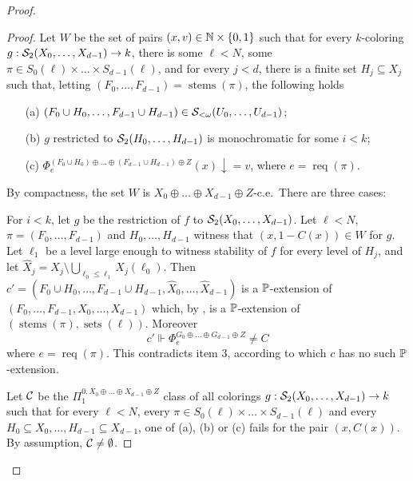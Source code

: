 \begin{proof}
\begin{proof}
Let $W$ be the set of pairs $(x, v) \in \mathbb{N} \times \{0,1\}$ such that for every $k$-coloring $g: \mathcal{S}_{2}({X_0, \dots, X_{d-1}}) \to k$, there is some $\ell < N$, some $\pi \in S_0(\ell) \times \dots \times S_{d-1}(\ell)$, and for every $j < d$, there is a finite set $H_j \subseteq X_j$ such that, letting $(F_0, \dots, F_{d-1}) = \operatorname{stems}(\pi)$, the following holds
\begin{itemize}
	\item[(a)] $(F_0 \cup H_0, \dots, F_{d-1} \cup H_{d-1}) \in \mathcal{S}_{<\omega}({U_0, \dots, U_{d-1}})$;
	\item[(b)] $g$ restricted to $\mathcal{S}_{2}({H_0, \dots, H_{d-1}})$ is monochromatic for some $i < k$;
	\item[(c)] $\Phi_e^{(F_0 \cup H_0) \oplus \dots \oplus (F_{d-1} \cup H_{d-1}) \oplus Z}(x)\downarrow = v$, where $e = \operatorname{req}(\pi)$.
\end{itemize}
By compactness, the set $W$ is $X_0 \oplus \dots \oplus X_{d-1} \oplus Z$-c.e.\ There are three cases:

 For $i < k$, let $g$ be the restriction of $f$ to $\mathcal{S}_{2}({X_0, \dots, X_{d-1}})$. Let $\ell < N$, $\pi = (F_0, \dots, F_{d-1})$ and $H_0, \dots, H_{d-1}$ witness that $(x, 1-C(x)) \in W$ for $g$.
	Let $\ell_1$ be a level large enough to witness stability of $f$ for every level of $H_j$, and let $\hat{X}_j = X_j \setminus \bigcup_{\ell_0 \leq \ell_1} X_j(\ell_0)$. Then $c' = (F_0 \cup H_0, \dots, F_{d-1} \cup H_{d-1}, \hat{X}_0, \dots, \hat{X}_{d-1})$ is a $\mathbb{P}$-extension of $(F_0, \dots, F_{d-1}, X_0, \dots, X_{d-1})$ which, by ,
		is a $\mathbb{P}$-extension of $(\operatorname{stems}(\pi), \operatorname{sets}(\ell))$.
		Moreover
		$$
			c' \Vdash \Phi_e^{G_0 \oplus \dots \oplus G_{d-1} \oplus Z} \neq C
		$$
		where $e = \operatorname{req}(\pi)$. This contradicts item 3, 
		according to which $c$ has no such $\mathbb{P}$-extension.

 Let $\mathcal{C}$ be the $\Pi^{0,X_0 \oplus \dots \oplus X_{d-1} \oplus Z}_1$ class of all colorings  $g: \mathcal{S}_{2}({X_0, \dots, X_{d-1}}) \to k$ such that for every $\ell < N$, every $\pi \in S_0(\ell) \times \dots \times S_{d-1}(\ell)$ and every $H_0 \subseteq X_0, \dots, H_{d-1} \subseteq X_{d-1}$, one of (a), (b) or (c) fails for the pair $(x, C(x))$.
	By assumption, $\mathcal{C} \neq \emptyset$. 
	


\end{proof}
\end{proof}
